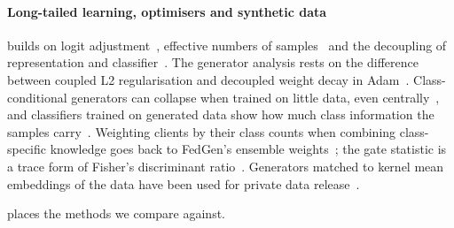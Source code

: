 \paragraph{Long-tailed learning, optimisers and synthetic data} \ours builds on logit adjustment~\cite{menon2021la},
effective numbers of samples~\cite{cui2019cb} and the decoupling of representation and
classifier~\cite{kang2020decoupling}. The generator analysis rests on the difference between coupled L2 regularisation
and decoupled weight decay in Adam~\cite{loshchilov2019adamw,kingma2015adam}. Class-conditional generators can collapse when
trained on little data, even centrally~\cite{shahbazi2022collapse}, and classifiers trained on generated data show
how much class information the samples carry~\cite{ravuri2019cas}. Weighting clients by their class counts when
combining class-specific knowledge goes back to FedGen's ensemble weights~\cite{zhu2021fedgen}; the gate statistic is
a trace form of Fisher's discriminant ratio~\cite{fisher1936}. Generators matched to kernel mean embeddings of the data have been used
for private data release~\cite{harder2021dpmerf}.

 places the methods we compare against.

